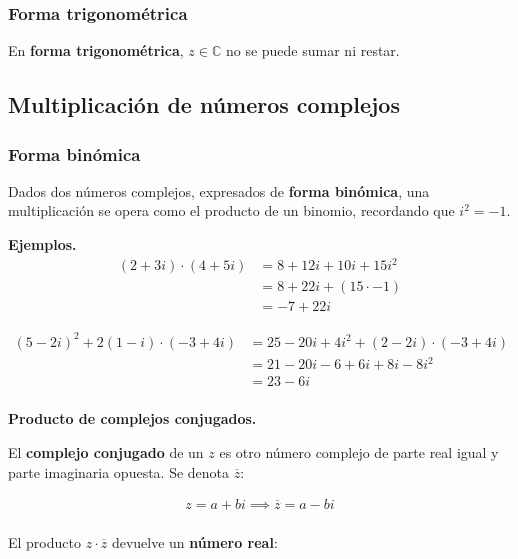 \documentclass[12pt]{article}
\begin{document}
\subsubsection{Forma trigonométrica}

En \textbf{forma trigonométrica},
\(z \in \mathbb{C}\) no se puede sumar ni restar.

\subsection{Multiplicación de números complejos}

\subsubsection{Forma binómica}

Dados dos números complejos,
expresados de \textbf{forma binómica},
una multiplicación se opera como el producto de un binomio,
recordando que \(i^2 = -1\).

\textbf{Ejemplos.}
\begin{align*}
    (2 + 3i) \cdot (4+5i) & = 8 + 12i + 10i + 15i^2   \\
                          & = 8 + 22i + (15 \cdot -1) \\
                          & = \boxed{-7 + 22i}
\end{align*}

\begin{align*}
    (5-2i)^2 + 2(1-i) \cdot (-3 + 4i) & = 25 - 20i + 4i^2 + (2 - 2i) \cdot (-3 + 4i) \\
                                      & = 21 - 20i - 6 + 6i + 8i - 8i^2              \\
                                      & = \boxed{23 - 6i}                            \\
\end{align*}

\textbf{Producto de complejos conjugados.}

El \textbf{complejo conjugado} de un \(z\)
es otro número complejo de parte real igual y parte imaginaria opuesta.
Se denota \(\overline{z}\):

\begin{align*}
    z = a + bi \implies \overline{z} = a - bi \\
\end{align*}

El producto \(z \cdot \overline{z}\) devuelve un \textbf{número real}:
\end{document}
